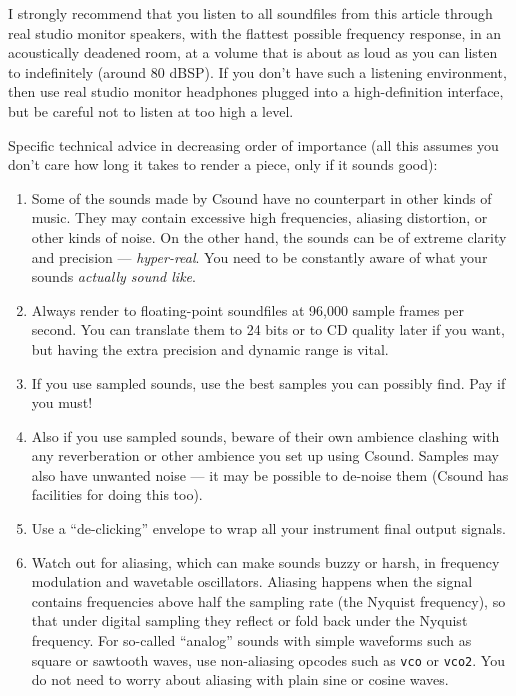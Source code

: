 \documentclass[english,11pt,letterpaper,onecolumn]{scrartcl}
\begin{document}
I strongly recommend that you listen to all soundfiles from this article 
through real studio monitor speakers, with the flattest possible frequency 
response, in an acoustically deadened room, at a volume that is about as loud 
as you can listen to indefinitely (around 80 dBSP). If you don't have such a 
listening environment, then use real studio monitor headphones plugged into a 
high-definition interface, but be careful not to listen at too high a level.

Specific technical advice in decreasing order of importance (all this assumes 
you don't care how long it takes to render a piece, only if it sounds good):

\begin{enumerate}
	\item Some of the sounds made by Csound have no counterpart in other kinds 
of music. They may contain excessive high frequencies, aliasing distortion, or 
other kinds of noise. On the other hand, the sounds can be of extreme clarity 
and precision --- \emph{hyper-real}. You need to be constantly aware of what 
your sounds \emph{actually sound like}.
	
	\item Always render to floating-point soundfiles at 96,000 sample frames 
per second. You can translate them to 24 bits or to CD quality later if you 
want, but having the extra precision and dynamic range is vital. 

	\item If you use sampled sounds, use the best samples you can possibly 
find. Pay if you must!
	
	\item Also if you use sampled sounds, beware of their own ambience 
clashing with any reverberation or other ambience you set up using Csound. 
Samples may also have unwanted noise --- it may be possible to de-noise them 
(Csound has facilities for doing this too).

	\item Use a ``de-clicking'' envelope to wrap all your instrument final 
output signals.

	\item Watch out for aliasing, which can make sounds buzzy or harsh, in 
frequency modulation and wavetable oscillators. Aliasing happens when the 
signal contains frequencies above half the sampling rate (the Nyquist 
frequency), so that under digital sampling they reflect or fold back under the 
Nyquist frequency. For so-called ``analog'' sounds with simple waveforms such 
as square or sawtooth waves, use non-aliasing opcodes such as \texttt{vco} or 
\texttt{vco2}. You do not need to worry about aliasing with plain sine or 
cosine waves.


\end{enumerate}
\end{document}
